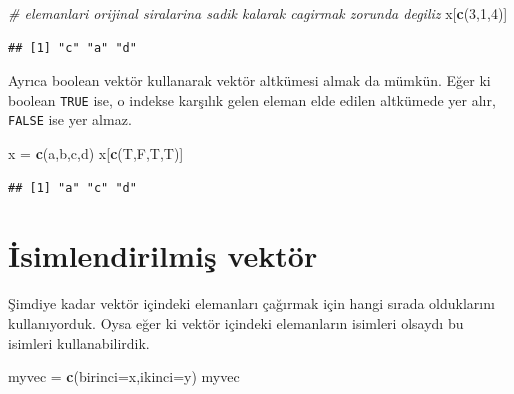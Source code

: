 \documentclass[
]{book}
\newenvironment{Shaded}{\begin{snugshade}}{\end{snugshade}}
\newcommand{\CommentTok}[1]{\textcolor[rgb]{0.56,0.35,0.01}{\textit{#1}}}
\newcommand{\DataTypeTok}[1]{\textcolor[rgb]{0.13,0.29,0.53}{#1}}
\newcommand{\DecValTok}[1]{\textcolor[rgb]{0.00,0.00,0.81}{#1}}
\newcommand{\KeywordTok}[1]{\textcolor[rgb]{0.13,0.29,0.53}{\textbf{#1}}}
\newcommand{\NormalTok}[1]{#1}
\newcommand{\StringTok}[1]{\textcolor[rgb]{0.31,0.60,0.02}{#1}}
\begin{document}
\begin{Shaded}
\begin{Highlighting}[]
\CommentTok{\# elemanlari orijinal siralarina sadik kalarak cagirmak zorunda degiliz}
\NormalTok{x[}\KeywordTok{c}\NormalTok{(}\DecValTok{3}\NormalTok{,}\DecValTok{1}\NormalTok{,}\DecValTok{4}\NormalTok{)]}
\end{Highlighting}
\end{Shaded}

\begin{verbatim}
## [1] "c" "a" "d"
\end{verbatim}

Ayrıca boolean vektör kullanarak vektör altkümesi almak da mümkün. Eğer ki boolean \texttt{TRUE} ise, o indekse karşılık gelen eleman elde edilen altkümede yer alır, \texttt{FALSE} ise yer almaz.

\begin{Shaded}
\begin{Highlighting}[]
\NormalTok{x =}\StringTok{ }\KeywordTok{c}\NormalTok{(}\StringTok{\textquotesingle{}a\textquotesingle{}}\NormalTok{,}\StringTok{\textquotesingle{}b\textquotesingle{}}\NormalTok{,}\StringTok{\textquotesingle{}c\textquotesingle{}}\NormalTok{,}\StringTok{\textquotesingle{}d\textquotesingle{}}\NormalTok{)}
\NormalTok{x[}\KeywordTok{c}\NormalTok{(T,F,T,T)]}
\end{Highlighting}
\end{Shaded}

\begin{verbatim}
## [1] "a" "c" "d"
\end{verbatim}

\hypertarget{isimlendirilmiux15f-vektuxf6r}{%
\section{İsimlendirilmiş vektör}\label{isimlendirilmiux15f-vektuxf6r}}

Şimdiye kadar vektör içindeki elemanları çağırmak için hangi sırada olduklarını kullanıyorduk. Oysa eğer ki vektör içindeki elemanların isimleri olsaydı bu isimleri kullanabilirdik.

\begin{Shaded}
\begin{Highlighting}[]
\NormalTok{myvec =}\StringTok{ }\KeywordTok{c}\NormalTok{(}\DataTypeTok{birinci=}\StringTok{\textquotesingle{}x\textquotesingle{}}\NormalTok{,}\DataTypeTok{ikinci=}\StringTok{\textquotesingle{}y\textquotesingle{}}\NormalTok{)}
\NormalTok{myvec}
\end{Highlighting}
\end{Shaded}
\end{document}
